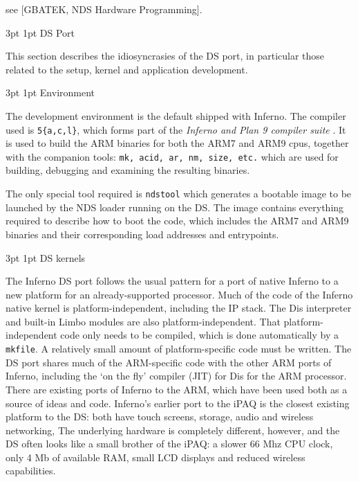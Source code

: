 \documentclass[11pt]{p9article}
\makeatletter
\renewcommand\section{\@startsection {section}{1}{\z@} {3pt} {1pt}
{\normalfont\normalsize\bfseries}}
\renewcommand\subsection{\@startsection {subsection}{1}{\z@} {3pt}
{1pt} {\normalfont\normalsize\bfseries}}
\makeatother
\begin{document}
see \cite{gbatek}[GBATEK, NDS Hardware Programming].

\section{DS Port}

This section describes the idiosyncrasies of the DS port,
in particular those related to the setup, kernel and application development.

\subsection{Environment}

The development environment is the default shipped with Inferno.
The compiler used is \texttt{5\{a,c,l\}}, which forms part of the
\emph{Inferno and Plan 9 compiler suite} \cite{ken-cc}.
It is used to build the ARM \cite{armarm} binaries for both the ARM7 and ARM9 cpus,
together with the companion tools: \texttt{mk, acid, ar, nm, size, etc.} which are used for building, debugging and examining the resulting binaries.

The only special tool required is \texttt{ndstool} \cite{ndstool} which generates a bootable image
to be launched by the NDS loader running on the DS. The image contains
everything required to describe how to boot the code, which includes
the ARM7 and ARM9 binaries and their corresponding load addresses and entrypoints.

\subsection{DS kernels}

The Inferno DS port follows the usual pattern for a port of native Inferno to a new platform
for an already-supported processor.
Much of the code of the Inferno native kernel is platform-independent, including the IP stack.
The Dis interpreter and built-in Limbo modules are also platform-independent.
That platform-independent code only needs to be compiled, which is done automatically by a \texttt{mkfile}.
A relatively small amount of platform-specific code must be written.
The DS port shares much of the ARM-specific code with the other ARM ports of Inferno,
including the `on the fly' compiler (JIT) for Dis for the ARM processor.
There are existing ports of Inferno to the ARM,
which have been used both as a source of ideas and code.
Inferno's earlier port to the iPAQ is the closest existing platform to the DS:
both have touch screens, storage, audio and wireless networking,
The underlying hardware is completely different, however,
and the DS often looks like a small brother of the iPAQ:
a slower 66 Mhz CPU clock, only 4 Mb of available RAM, small LCD displays and reduced wireless capabilities.
\end{document}
